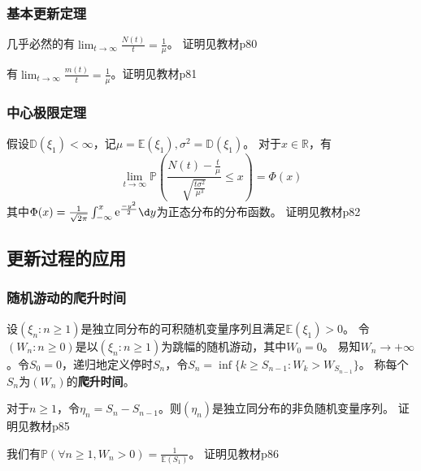 \documentclass[main]{subfiles}
\begin{document}
\subsubsection{基本更新定理}
\begin{theorem}\label{the:nt/t}
  几乎必然的有\(\lim_{t \to \infty}\frac{N(t)}{t}=\frac{1}{\mu}\)。
  证明见教材p80
\end{theorem}
\begin{theorem}[基本更新定理]\label{the:fun_renew_thm}
  有\(\lim_{t \to \infty}\frac{m(t)}{t}=\frac{1}{\mu}\)。证明见教材p81
\end{theorem}
\subsubsection{中心极限定理}
\begin{theorem}\label{the:center_limit_thm}
  假设\(\mathbb{D}(\xi_1)<\infty\)，记\(\mu=\mathbb{E}(\xi_1),\sigma^2=\mathbb{D}(\xi_1)\)。
  对于\(x \in \mathbb{R}\)，有
  \begin{equation}
    \lim_{t \to \infty}\mathbb{P}\left(\frac{N(t)-\frac{t}{\mu}}{\sqrt{\frac{t \sigma^2}{\mu^3}}} \leq x\right) = \Phi(x)
  \end{equation}
  其中\(\Phi(x)=\frac{1}{\sqrt{2 \pi}}\int_{-\infty}^x \mathrm{e}^{\frac{-y^2}{2}} \d y\)为正态分布的分布函数。
  证明见教材p82
\end{theorem}
\subsection{更新过程的应用}
\subsubsection{随机游动的爬升时间}
\begin{definition}\label{def:climb_time}
  设\((\xi_n:n \geq 1)\)是独立同分布的可积随机变量序列且满足\(\mathbb{E}(\xi_1)>0\)。
  令\((W_n:n \geq 0)\)是以\((\xi_n:n \geq 1)\)为跳幅的随机游动，其中\(W_0=0\)。
  易知\(W_n \to +\infty\)。令\(S_0=0\)，递归地定义停时\(S_n\)，令\(S_n=\inf \{k \geq S_{n-1}:W_k > W_{S_{n-1}}\}\)。
  称每个\(S_n\)为\((W_n)\)的\textbf{爬升时间}。
\end{definition}
\begin{theorem}\label{the:3.3.1}
  对于\(n \geq 1\)，令\(\eta_n=S_n-S_{n-1}\)。则\((\eta_n)\)是独立同分布的非负随机变量序列。
  证明见教材p85
\end{theorem}
\begin{theorem}\label{the:3.3.2}
  我们有\(\mathbb{P}(\forall n \geq 1,W_n>0)=\frac{1}{\mathbb{E}(S_1)}\)。
  证明见教材p86
\end{theorem}
\end{document}
